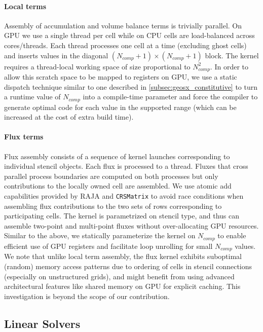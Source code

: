\paragraph{Local terms}
Assembly of accumulation and volume balance terms is trivially parallel.   On GPU we use a single thread per cell while on CPU cells are load-balanced across cores/threads.    Each thread processes one cell at a time (excluding ghost cells) and inserts values in the diagonal $(N_{comp}+1)\times(N_{comp}+1)$ block.   The kernel requires a thread-local working space of size proportional to $N_{comp}^2$.   In order to allow this scratch space to be mapped to registers on GPU, we use a static dispatch technique similar to one described in \cref{subsec:geosx_constitutive} to turn a runtime value of $N_{comp}$ into a compile-time parameter and force the compiler to generate optimal code for each value in the supported range (which can be increased at the cost of extra build time).

\paragraph{Flux terms}
Flux assembly consists of a sequence of kernel launches corresponding to individual stencil objects.   Each flux is processed to a thread.   Fluxes that cross parallel process boundaries are computed on both processes but only contributions to the locally owned cell are assembled.   We use atomic add capabilities provided by RAJA and \texttt{CRSMatrix} to avoid race conditions when assembling flux contributions to the two sets of rows corresponding to participating cells.   The kernel is parametrized on stencil type, and thus can assemble two-point and multi-point fluxes without over-allocating GPU resources.   Similar to the above, we statically parameterize the kernel on $N_{comp}$ to enable efficient use of GPU registers and facilitate loop unrolling for small $N_{comp}$ values.   We note that unlike local term assembly, the flux kernel exhibits suboptimal (random) memory access patterns due to ordering of cells in stencil connections (especially on unstructured grids), and might benefit from using advanced architectural features like shared memory on GPU for explicit caching.   This investigation is beyond the scope of our contribution.

\subsection{Linear Solvers}
\label{subsec:geosx_components_linear}


